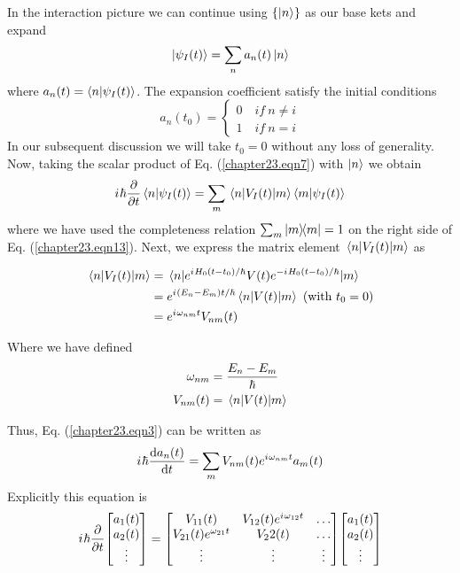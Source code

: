 In the interaction picture we can continue using $\{\ket{n}\}$ as our base kets and expand
\begin{equation}
\label{chapter23.eqn11}
	\ket{\psi_I(t)} = \sum_{n} a_n(t) \ket{n}
\end{equation}
where $a_n(t) = \braket{n}{\psi_I(t)}$. The expansion coefficient satisfy the initial conditions
\begin{equation}
\label{chapter23.eqn12}
a_n(t_0) = \begin{cases}
0 \quad if \ n\neq i \\
1 \quad if \ n = i 
\end{cases}
\end{equation}
In our subsequent discussion we will take $t_0 = 0$ without any loss of generality. Now, taking the scalar product of Eq. (\ref{chapter23.eqn7}) with $\ket{n}$ we obtain
\begin{equation}
\label{chapter23.eqn13}
{i\mkern1mu} \hbar \pdv{}{t} \braket{n}{\psi_I(t)} = \sum_{m} \mel{n}{V_I(t)}{m} \braket{m}{\psi_I(t)}
\end{equation}
where we have used the completeness relation $\sum_{m} \ketbra{m}{m} = 1$ on the right side of Eq. (\ref{chapter23.eqn13}). Next, we express the matrix element $\mel{n}{V_I(t)}{m}$ as

\begin{align}
\mel{n}{V_I(t)}{m} 
&= \mel{n}{e^{{i\mkern1mu}H_0 (t-t_0)/\hbar} V(t) e^{-{i\mkern1mu}H_0 (t-t_0)/\hbar}}{m} \nonumber\\
&= e^{{i\mkern1mu} (E_n - E_m) t/\hbar} \mel{n}{V(t)}{m} \ (\text{with } t_0 = 0) \nonumber\\
&= e^{{i\mkern1mu} \omega_{n m} t} V_{n m}(t)
\label{chapter23.eqn14}
\end{align}

Where we have defined
\begin{align}
\label{chapter23.eqn15}
\omega_{n m} &= \frac{E_n - E_m}{\hbar} \\
\label{chapter23.eqn16}
V_{n m}(t) &= \mel{n}{V(t)}{m}
\end{align}

Thus, Eq. (\ref{chapter23.eqn3}) can be written as
\begin{equation}
\label{chapter23.eqn17}
{i\mkern1mu} \hbar \dv{a_n(t)}{t} = \sum_{m} V_{n m}(t) e^{{i\mkern1mu} \omega_{n m} t} a_m(t)
\end{equation}
Explicitly this equation is
\begin{equation}
\label{chapter23.eqn18}
\iu \hbar \pdv{}{t}
\mqty[a_1(t) \\ a_2(t) \\ \vdots] = 
\mqty[V_{11}(t) & V_{12}(t) e^{\iu\omega_{12}t} & \ldots\\
V_{21}(t)e^{\omega_{21}t} & V_22(t) & \ldots \\
\vdots & \vdots & \vdots
]
\mqty[a_1(t) \\ a_2(t) \\ \vdots]
\end{equation}

